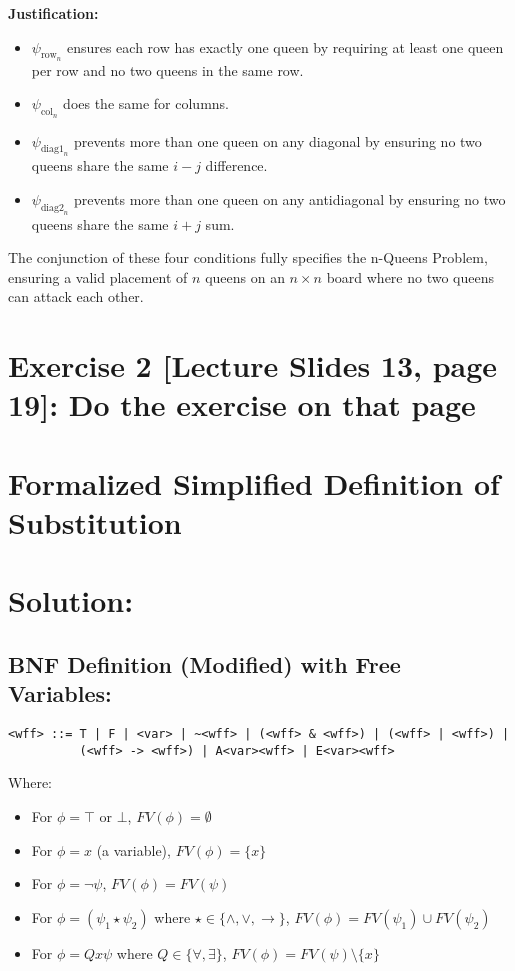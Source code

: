 \documentclass{article}
\begin{document}
\textbf{Justification:}
\begin{itemize}
    \item $\psi_{\text{row}_n}$ ensures each row has exactly one queen by requiring at least one queen per row and no two queens in the same row.
    \item $\psi_{\text{col}_n}$ does the same for columns.
    \item $\psi_{\text{diag1}_n}$ prevents more than one queen on any diagonal by ensuring no two queens share the same $i-j$ difference.
    \item $\psi_{\text{diag2}_n}$ prevents more than one queen on any antidiagonal by ensuring no two queens share the same $i+j$ sum.
\end{itemize}

The conjunction of these four conditions fully specifies the n-Queens Problem, ensuring a valid placement of $n$ queens on an $n \times n$ board where no two queens can attack each other.

\newpage

\section*{Exercise 2 [Lecture Slides 13, page 19]: Do the exercise on that page}

\section*{Formalized Simplified Definition of Substitution}
\section*{Solution:}

\subsection*{ BNF Definition (Modified) with Free Variables:}

\begin{verbatim}
<wff> ::= T | F | <var> | ~<wff> | (<wff> & <wff>) | (<wff> | <wff>) | 
          (<wff> -> <wff>) | A<var><wff> | E<var><wff>
\end{verbatim}

Where:
\begin{itemize}
    \item For $\phi = \top$ or $\bot$, $FV(\phi) = \emptyset$
    \item For $\phi = x$ (a variable), $FV(\phi) = \{x\}$
    \item For $\phi = \neg\psi$, $FV(\phi) = FV(\psi)$
    \item For $\phi = (\psi_1 \star \psi_2)$ where $\star \in \{\wedge, \vee, \rightarrow\}$, $FV(\phi) = FV(\psi_1) \cup FV(\psi_2)$
    \item For $\phi = Qx \psi$ where $Q \in \{\forall, \exists\}$, $FV(\phi) = FV(\psi) \setminus \{x\}$
\end{itemize}
\end{document}
